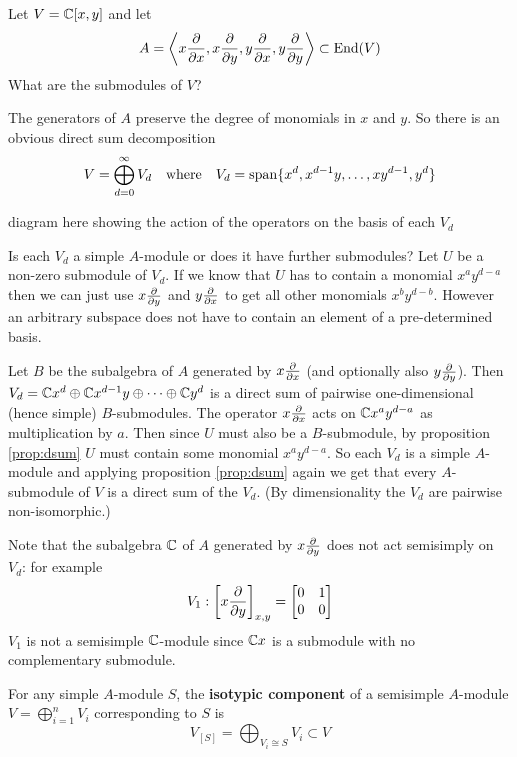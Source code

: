 \begin{exam}
	Let $V = \mathbb{C}[x,y]$ and let
	\[A = {\left\langle x \frac{\partial}{\partial x}, x \frac{\partial}{\partial y}, y \frac{\partial}{\partial x}, y \frac{\partial}{\partial y} \right\rangle} \subset \operatorname{End}(V)\]
	What are the submodules of $V$?
	
	The generators of $A$ preserve the degree of monomials in $x$ and $y$.
	So there is an obvious direct sum decomposition
	\[V = \bigoplus_{d=0}^\infty V_d \quad \mbox{where} \quad V_d = \operatorname{span}\{x^d,x^{d-1}y,\ldots,xy^{d-1},y^d\}\]
	
	diagram here showing the action of the operators on the basis of each $V_d$
	
	Is each $V_d$ a simple $A$-module or does it have further submodules?
	Let $U$ be a non-zero submodule of $V_d$.
	If we know that $U$ has to contain a monomial $x^ay^{d-a}$ then we can just use $x \tfrac{\partial}{\partial y}$ and $y \tfrac{\partial}{\partial x}$ to get all other monomials $x^by^{d-b}$.
	However an arbitrary subspace does not have to contain an element of a pre-determined basis.
	
	Let $B$ be the subalgebra of $A$ generated by $x \tfrac{\partial}{\partial x}$ (and optionally also $y \tfrac{\partial}{\partial y}$).
	Then $V_d = \mathbb{C} x^d \oplus \mathbb{C} x^{d-1}y \oplus \cdots \oplus \mathbb{C} y^d$ is a direct sum of pairwise one-dimensional (hence simple) $B$-submodules.
	The operator $x \tfrac{\partial}{\partial x}$ acts on $\mathbb{C} x^a y^{d-a}$ as multiplication by $a$.
	Then since $U$ must also be a $B$-submodule, by proposition \ref{prop:dsum} $U$ must contain some monomial $x^a y^{d-a}$.
	So each $V_d$ is a simple $A$-module and applying proposition \ref{prop:dsum} again we get that every $A$-submodule of $V$ is a direct sum of the $V_d$.
	(By dimensionality the $V_d$ are pairwise non-isomorphic.)
	
	Note that the subalgebra $\mathbb{C}$ of $A$ generated by $x \tfrac{\partial}{\partial y}$ does not act semisimply on $V_d$: for example
	\[V_1: \left[x \frac{\partial}{\partial y}\right]_{x,y} =
		\begin{bmatrix}
			0 & 1 \\
			0 & 0
		\end{bmatrix}
	\]
	$V_1$ is not a semisimple $\mathbb{C}$-module since $\mathbb{C} x$ is a submodule with no complementary submodule.
\end{exam}

\begin{defn}
	For any simple $A$-module $S$, the \textbf{isotypic component} of a semisimple $A$-module $V = \bigoplus_{i=1}^n V_i$ corresponding to $S$ is
	\[V_{[S]} = \bigoplus_{V_i \cong S}V_i \subset V\]
\end{defn}

